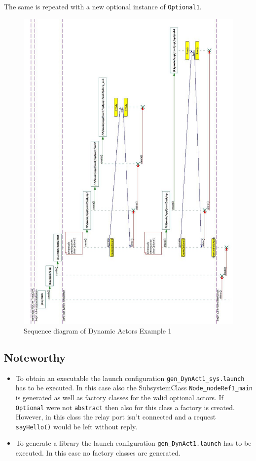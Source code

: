 The same is repeated with a new optional instance of \texttt{Optional1}.

\begin{figure}
\includegraphics[scale=0.45]{images/039-DynAct1-MSC.jpg}
\caption{Sequence diagram of Dynamic Actors Example 1}
\label{fig:dynact1_msc}
\end{figure}

\subsection{Noteworthy}

\begin{itemize}
\item To obtain an executable the launch configuration \texttt{gen\_DynAct1\_sys.launch} has to be executed.
In this case also the SubsystemClass \texttt{Node\_nodeRef1\_main} is generated as well as factory classes
for the valid optional actors. If \texttt{Optional} were not \texttt{abstract} then also for this class
a factory is created. However, in this class the relay port isn't connected and a request \texttt{sayHello()}
would be left without reply.
\item To generate a library the launch configuration \texttt{gen\_DynAct1.launch} has to be executed.
In this case no factory classes are generated.
\end{itemize}


